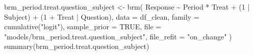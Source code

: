 \documentclass[
  12pt,
  a4paper,
  extrafontsizes,
  onecolumn,
  openright]{memoir}
\newenvironment{Shaded}{\begin{snugshade}}{\end{snugshade}}
\newcommand{\AttributeTok}[1]{\textcolor[rgb]{0.40,0.45,0.13}{#1}}
\newcommand{\ConstantTok}[1]{\textcolor[rgb]{0.56,0.35,0.01}{#1}}
\newcommand{\DecValTok}[1]{\textcolor[rgb]{0.68,0.00,0.00}{#1}}
\newcommand{\FunctionTok}[1]{\textcolor[rgb]{0.28,0.35,0.67}{#1}}
\newcommand{\NormalTok}[1]{\textcolor[rgb]{0.00,0.23,0.31}{#1}}
\newcommand{\OtherTok}[1]{\textcolor[rgb]{0.00,0.23,0.31}{#1}}
\newcommand{\SpecialCharTok}[1]{\textcolor[rgb]{0.37,0.37,0.37}{#1}}
\newcommand{\StringTok}[1]{\textcolor[rgb]{0.13,0.47,0.30}{#1}}
\begin{document}
\begin{Shaded}
\begin{Highlighting}[]
\NormalTok{brm\_period.treat.question\_subject }\OtherTok{\textless{}{-}} \FunctionTok{brm}\NormalTok{(}
\NormalTok{    Response }\SpecialCharTok{\textasciitilde{}}\NormalTok{ Period }\SpecialCharTok{*}\NormalTok{ Treat }\SpecialCharTok{+}\NormalTok{ (}\DecValTok{1} \SpecialCharTok{|}\NormalTok{ Subject) }\SpecialCharTok{+}\NormalTok{ (}\DecValTok{1} \SpecialCharTok{+}\NormalTok{ Treat }\SpecialCharTok{|}\NormalTok{ Question),}
    \AttributeTok{data =}\NormalTok{ df\_clean,}
    \AttributeTok{family =} \FunctionTok{cumulative}\NormalTok{(}\StringTok{"logit"}\NormalTok{),}
    \AttributeTok{sample\_prior =} \ConstantTok{TRUE}\NormalTok{,}
    \AttributeTok{file =} \StringTok{"models/brm\_period.treat.question\_subject"}\NormalTok{,}
    \AttributeTok{file\_refit =} \StringTok{"on\_change"}
\NormalTok{)}
\FunctionTok{summary}\NormalTok{(brm\_period.treat.question\_subject)}
\end{Highlighting}
\end{Shaded}
\end{document}
